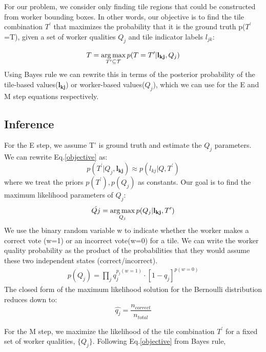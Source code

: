 \par For our problem, we consider only finding tile regions that could be constructed from worker bounding boxes. In other words, our objective is to find the tile combination $T^\prime$ that maximizes the probability that it is the ground truth p($T^\prime$=T), given a set of worker qualities $Q_j$ and tile indicator labels $l_{jk}$: 

\begin{equation}
T = \operatorname*{arg\,max}_{T^\prime \subseteq \mathcal{T}}p(T=T^\prime |  \mathbf{l_{kj}},Q_j)
\label{objective}
\end{equation}
Using Bayes rule we can rewrite this in terms of the posterior probability of the tile-based values($\mathbf{l_{kj}}$) or worker-based values($Q_{j}$), which we can use for the E and M step equations respectively. 
\subsection{Inference}
\par For the E step, we assume T' is ground truth and estimate the $Q_j$ parameters. We can rewrite Eq.\ref{objective} as: 
\begin{equation}
p(T^\prime| Q_j,\mathbf{l_{kj}})
\approx p(l_{kj}| Q,T^\prime)
\end{equation}
where we treat the priors $p(T^\prime),p(Q_j)$ as constants.
Our goal is to find the maximum likelihood parameters of $Q_j$: 
\begin{equation}
\hat{Qj} = \operatorname*{arg\,max}_{Q_j} p(Q_j| \mathbf{l_{kj}},T^\prime)
\end{equation}
We use the binary random variable w to indicate whether the worker makes a correct vote (w=1) or an incorrect vote(w=0) for a tile. We can write the worker quality probability as the product of the probabilities that they would assume these two independent states (correct/incorrect). 
\begin{align}
p(Q_j) = \prod_j q_j^{p_j(w=1)}\cdot [1-q_j]^{p(w=0)}
\end{align}
The closed form of the maximum likelihood solution for the Bernoulli distribution reduces down to: 
\begin{equation}
\hat{q_j}=\frac{n_{correct}}{n_{total}}
\end{equation}
\par For the M step, we maximize the likelihood of the tile combination $T^\prime$ for a fixed set of worker qualities, $\{Q_j\}$. Following Eq.\ref{objective} from Bayes rule, 
